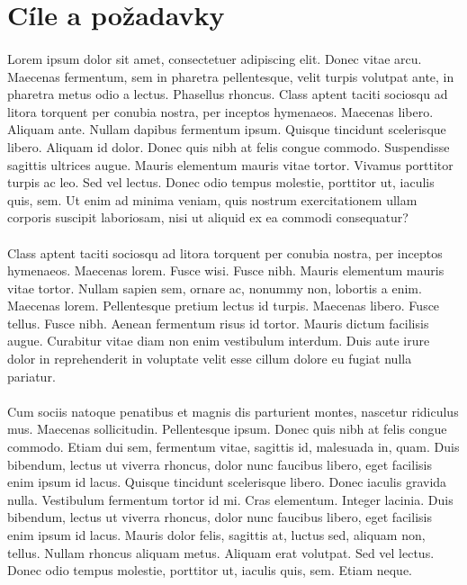 \documentclass{article}
\begin{document}
	\newpage
	\section{Cíle a požadavky}
	\paragraph{} Lorem ipsum dolor sit amet, consectetuer adipiscing elit. Donec vitae arcu. Maecenas fermentum, sem in pharetra pellentesque, velit turpis volutpat ante, in pharetra metus odio a lectus. Phasellus rhoncus. Class aptent taciti sociosqu ad litora torquent per conubia nostra, per inceptos hymenaeos. Maecenas libero. Aliquam ante. Nullam dapibus fermentum ipsum. Quisque tincidunt scelerisque libero. Aliquam id dolor. Donec quis nibh at felis congue commodo. Suspendisse sagittis ultrices augue. Mauris elementum mauris vitae tortor. Vivamus porttitor turpis ac leo. Sed vel lectus. Donec odio tempus molestie, porttitor ut, iaculis quis, sem. Ut enim ad minima veniam, quis nostrum exercitationem ullam corporis suscipit laboriosam, nisi ut aliquid ex ea commodi consequatur?
	\paragraph{} Class aptent taciti sociosqu ad litora torquent per conubia nostra, per inceptos hymenaeos. Maecenas lorem. Fusce wisi. Fusce nibh. Mauris elementum mauris vitae tortor. Nullam sapien sem, ornare ac, nonummy non, lobortis a enim. Maecenas lorem. Pellentesque pretium lectus id turpis. Maecenas libero. Fusce tellus. Fusce nibh. Aenean fermentum risus id tortor. Mauris dictum facilisis augue. Curabitur vitae diam non enim vestibulum interdum. Duis aute irure dolor in reprehenderit in voluptate velit esse cillum dolore eu fugiat nulla pariatur.
	\paragraph{} Cum sociis natoque penatibus et magnis dis parturient montes, nascetur ridiculus mus. Maecenas sollicitudin. Pellentesque ipsum. Donec quis nibh at felis congue commodo. Etiam dui sem, fermentum vitae, sagittis id, malesuada in, quam. Duis bibendum, lectus ut viverra rhoncus, dolor nunc faucibus libero, eget facilisis enim ipsum id lacus. Quisque tincidunt scelerisque libero. Donec iaculis gravida nulla. Vestibulum fermentum tortor id mi. Cras elementum. Integer lacinia. Duis bibendum, lectus ut viverra rhoncus, dolor nunc faucibus libero, eget facilisis enim ipsum id lacus. Mauris dolor felis, sagittis at, luctus sed, aliquam non, tellus. Nullam rhoncus aliquam metus. Aliquam erat volutpat. Sed vel lectus. Donec odio tempus molestie, porttitor ut, iaculis quis, sem. Etiam neque.
	
\end{document}

